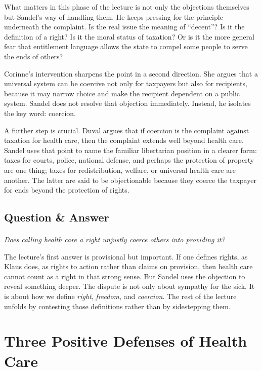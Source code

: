 What matters in this phase of the lecture is not only the objections themselves but Sandel's way of handling them. He keeps pressing for the principle underneath the complaint. Is the real issue the meaning of ``decent''? Is it the definition of a right? Is it the moral status of taxation? Or is it the more general fear that entitlement language allows the state to compel some people to serve the ends of others?

Corinne's intervention sharpens the point in a second direction. She argues that a universal system can be coercive not only for taxpayers but also for recipients, because it may narrow choice and make the recipient dependent on a public system. Sandel does not resolve that objection immediately. Instead, he isolates the key word: coercion.

A further step is crucial. Duval argues that if coercion is the complaint against taxation for health care, then the complaint extends well beyond health care. Sandel uses that point to name the familiar libertarian position in a clearer form: taxes for courts, police, national defense, and perhaps the protection of property are one thing; taxes for redistribution, welfare, or universal health care are another. The latter are said to be objectionable because they coerce the taxpayer for ends beyond the protection of rights.

\subsection{Question \& Answer}

\paragraph{}
\emph{Does calling health care a right unjustly coerce others into providing it?}

The lecture's first answer is provisional but important. If one defines rights, as Klaus does, as rights to action rather than claims on provision, then health care cannot count as a right in that strong sense. But Sandel uses the objection to reveal something deeper. The dispute is not only about sympathy for the sick. It is about how we define \emph{right}, \emph{freedom}, and \emph{coercion}. The rest of the lecture unfolds by contesting those definitions rather than by sidestepping them.

\section{Three Positive Defenses of Health Care}

